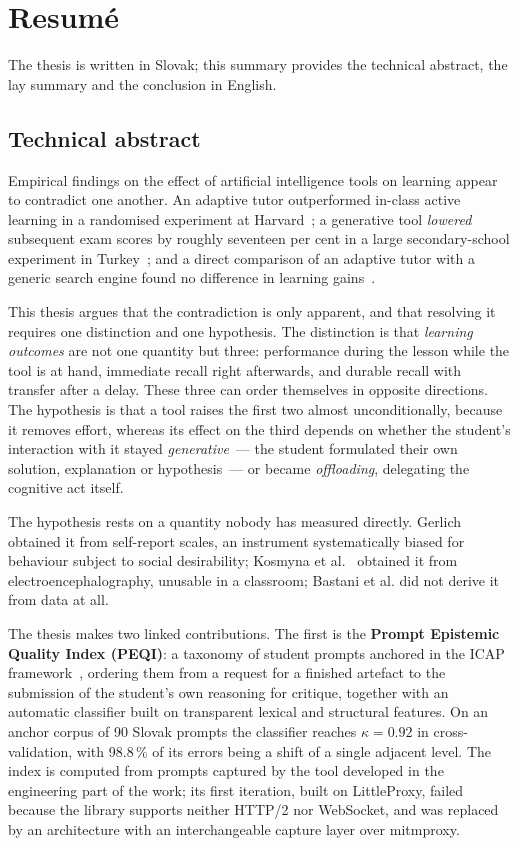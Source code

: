 \chapter*{Resumé}
\label{chapter:resume}

The thesis is written in Slovak; this summary provides the technical abstract, the lay summary and the conclusion in English.

\section*{Technical abstract}

Empirical findings on the effect of artificial intelligence tools on learning appear to contradict one another. An adaptive tutor outperformed in-class active learning in a randomised experiment at Harvard~\cite{kestin2025aitutoring}; a generative tool \emph{lowered} subsequent exam scores by roughly seventeen per cent in a large secondary-school experiment in Turkey~\cite{bastani2025harm}; and a direct comparison of an adaptive tutor with a generic search engine found no difference in learning gains~\cite{slijepcevic2025khanmigo}.

This thesis argues that the contradiction is only apparent, and that resolving it requires one distinction and one hypothesis. The distinction is that \emph{learning outcomes} are not one quantity but three: performance during the lesson while the tool is at hand, immediate recall right afterwards, and durable recall with transfer after a delay. These three can order themselves in opposite directions. The hypothesis is that a tool raises the first two almost unconditionally, because it removes effort, whereas its effect on the third depends on whether the student's interaction with it stayed \emph{generative}~--- the student formulated their own solution, explanation or hypothesis~--- or became \emph{offloading}, delegating the cognitive act itself.

The hypothesis rests on a quantity nobody has measured directly. Gerlich~\cite{gerlich2025offloading} obtained it from self-report scales, an instrument systematically biased for behaviour subject to social desirability; Kosmyna et al.~\cite{kosmyna2025brain} obtained it from electroencephalography, unusable in a classroom; Bastani et al. did not derive it from data at all.

The thesis makes two linked contributions. The first is the \textbf{Prompt Epistemic Quality Index (PEQI)}: a taxonomy of student prompts anchored in the ICAP framework~\cite{chi2014icap}, ordering them from a request for a finished artefact to the submission of the student's own reasoning for critique, together with an automatic classifier built on transparent lexical and structural features. On an anchor corpus of 90 Slovak prompts the classifier reaches $\kappa = 0.92$ in cross-validation, with 98.8\,\% of its errors being a shift of a single adjacent level. The index is computed from prompts captured by the tool developed in the engineering part of the work; its first iteration, built on LittleProxy, failed because the library supports neither HTTP/2 nor WebSocket, and was replaced by an architecture with an interchangeable capture layer over mitmproxy.

